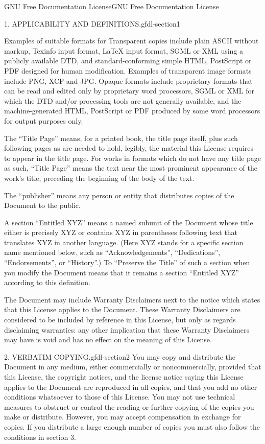 \documentclass[10pt,]{book}
\numberwithin{equation}{section}
\begin{document}
\begin{appendixptx}{GNU Free Documentation License}{}{GNU Free Documentation License}{}{}
\begin{paragraphs}{1. APPLICABILITY AND DEFINITIONS.}{gfdl-section1}
\par
\hypertarget{p-1318}{}%
Examples of suitable formats for Transparent copies include plain ASCII without markup, Texinfo input format, LaTeX input format, SGML or XML using a publicly available DTD, and standard-conforming simple HTML, PostScript or PDF designed for human modification. Examples of transparent image formats include PNG, XCF and JPG. Opaque formats include proprietary formats that can be read and edited only by proprietary word processors, SGML or XML for which the DTD and/or processing tools are not generally available, and the machine-generated HTML, PostScript or PDF produced by some word processors for output purposes only.%
\par
\hypertarget{p-1319}{}%
The ``Title Page'' means, for a printed book, the title page itself, plus such following pages as are needed to hold, legibly, the material this License requires to appear in the title page. For works in formats which do not have any title page as such, ``Title Page'' means the text near the most prominent appearance of the work's title, preceding the beginning of the body of the text.%
\par
\hypertarget{p-1320}{}%
The ``publisher'' means any person or entity that distributes copies of the Document to the public.%
\par
\hypertarget{p-1321}{}%
A section ``Entitled XYZ'' means a named subunit of the Document whose title either is precisely XYZ or contains XYZ in parentheses following text that translates XYZ in another language. (Here XYZ stands for a specific section name mentioned below, such as ``Acknowledgements'', ``Dedications'', ``Endorsements'', or ``History''.) To ``Preserve the Title'' of such a section when you modify the Document means that it remains a section ``Entitled XYZ'' according to this definition.%
\par
\hypertarget{p-1322}{}%
The Document may include Warranty Disclaimers next to the notice which states that this License applies to the Document. These Warranty Disclaimers are considered to be included by reference in this License, but only as regards disclaiming warranties: any other implication that these Warranty Disclaimers may have is void and has no effect on the meaning of this License.%
\end{paragraphs}%
\begin{paragraphs}{2. VERBATIM COPYING.}{gfdl-section2}%
\hypertarget{p-1323}{}%
You may copy and distribute the Document in any medium, either commercially or noncommercially, provided that this License, the copyright notices, and the license notice saying this License applies to the Document are reproduced in all copies, and that you add no other conditions whatsoever to those of this License. You may not use technical measures to obstruct or control the reading or further copying of the copies you make or distribute. However, you may accept compensation in exchange for copies. If you distribute a large enough number of copies you must also follow the conditions in section 3.%

\end{paragraphs}
\end{appendixptx}
\end{document}
